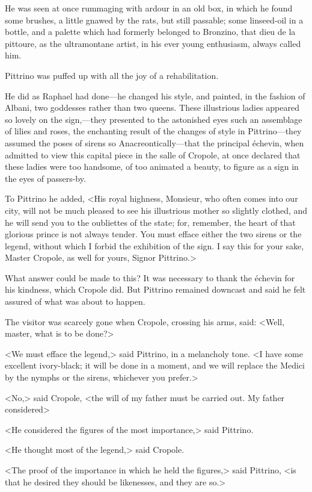 He was seen at once rummaging with ardour in an old box, in which he found some brushes, a little gnawed by the rats, but still passable; some linseed-oil in a bottle, and a palette which had formerly belonged to Bronzino, that dieu de la pittoure, as the ultramontane artist, in his ever young enthusiasm, always called him.

Pittrino was puffed up with all the joy of a rehabilitation.

He did as Raphael had done—he changed his style, and painted, in the fashion of Albani, two goddesses rather than two queens. These illustrious ladies appeared so lovely on the sign,—they presented to the astonished eyes such an assemblage of lilies and roses, the enchanting result of the changes of style in Pittrino—they assumed the poses of sirens so Anacreontically—that the principal échevin, when admitted to view this capital piece in the salle of Cropole, at once declared that these ladies were too handsome, of too animated a beauty, to figure as a sign in the eyes of passers-by.

To Pittrino he added, <His royal highness, Monsieur, who often comes into our city, will not be much pleased to see his illustrious mother so slightly clothed, and he will send you to the oubliettes of the state; for, remember, the heart of that glorious prince is not always tender. You must efface either the two sirens or the legend, without which I forbid the exhibition of the sign. I say this for your sake, Master Cropole, as well for yours, Signor Pittrino.>

What answer could be made to this? It was necessary to thank the échevin for his kindness, which Cropole did. But Pittrino remained downcast and said he felt assured of what was about to happen.

The visitor was scarcely gone when Cropole, crossing his arms, said: <Well, master, what is to be done?>

<We must efface the legend,> said Pittrino, in a melancholy tone. <I have some excellent ivory-black; it will be done in a moment, and we will replace the Medici by the nymphs or the sirens, whichever you prefer.>

<No,> said Cropole, <the will of my father must be carried out. My father considered\longdash>

<He considered the figures of the most importance,> said Pittrino.

<He thought most of the legend,> said Cropole.

<The proof of the importance in which he held the figures,> said Pittrino, <is that he desired they should be likenesses, and they are so.>

